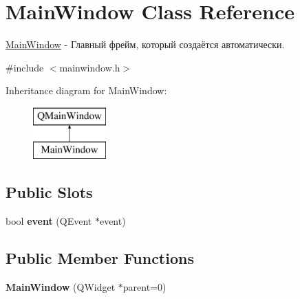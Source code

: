 \hypertarget{class_main_window}{}\section{Main\+Window Class Reference}
\label{class_main_window}


\hyperlink{class_main_window}{Main\+Window} -\/ Главный фрейм, который создаётся автоматически.  




{\ttfamily \#include $<$mainwindow.\+h$>$}

Inheritance diagram for Main\+Window\+:\begin{figure}[H]
\begin{center}
\leavevmode
\includegraphics[height=2.000000cm]{class_main_window}
\end{center}
\end{figure}
\subsection*{Public Slots}
\begin{DoxyCompactItemize}
\item 
\mbox{\label{class_main_window_aaab29f305f38d7e4cca212c97a442536}} 
bool {\bfseries event} (Q\+Event $\ast$event)
\end{DoxyCompactItemize}
\subsection*{Public Member Functions}
\begin{DoxyCompactItemize}
\item 
\mbox{\label{class_main_window_a8b244be8b7b7db1b08de2a2acb9409db}} 
{\bfseries Main\+Window} (Q\+Widget $\ast$parent=0)
\end{DoxyCompactItemize}
